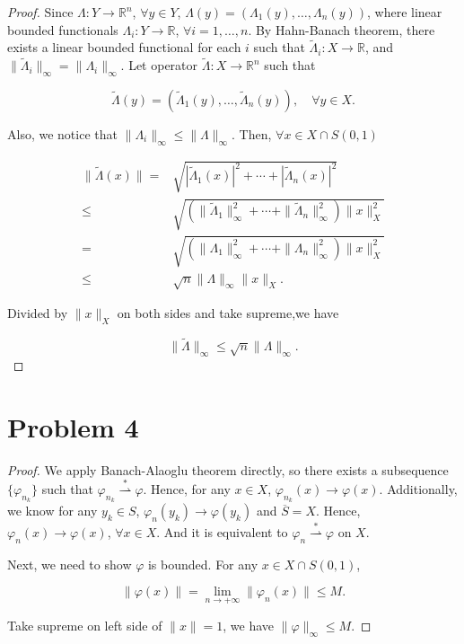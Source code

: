 \documentclass[12pt]{article}
\begin{document}
\begin{proof}

Since $\Lambda: Y \rightarrow \mathbb R^n$, $\forall y\in Y$, $\Lambda(y) = (\Lambda_1(y), \dots, \Lambda_n(y))$, where linear bounded functionals $\Lambda_i : Y \rightarrow \mathbb R$, $\forall i = 1, \dots, n$. By Hahn-Banach theorem, there exists a linear bounded functional for each $i$ such that $\widetilde \Lambda_i: X \rightarrow \mathbb R$, and $\|\widetilde \Lambda_i\|_\infty = \|\Lambda_i\|_\infty$. Let operator $\widetilde\Lambda: X \rightarrow \mathbb R^n$ such that 

$$
\widetilde\Lambda(y) = (\widetilde\Lambda_1(y), \dots, \widetilde\Lambda_n(y)), \quad \forall y\in X.
$$

Also, we notice that $\|\Lambda_i\|_\infty \leqslant \|\Lambda\|_\infty$.
Then, $\forall x\in X\cap S(0, 1)$ 

$$
\begin{aligned}
\|\widetilde\Lambda(x)\| = & \sqrt{|\widetilde\Lambda_1(x)|^2 + \cdots + |\widetilde\Lambda_n(x)|^2} \\
 \leqslant & \sqrt{(\|\widetilde\Lambda_1\|_\infty^2 + \cdots + \|\widetilde\Lambda_n\|_\infty^2) \|x\|_X^2} \\
 = & \sqrt{(\|\Lambda_1\|_\infty^2 + \cdots + \|\Lambda_n\|_\infty^2)\|x\|_X^2} \\
 \leqslant & \sqrt{n} \|\Lambda\|_\infty \|x\|_X.
\end{aligned}
$$ 

Divided by $\|x\|_X$ on both sides and take supreme,we have

$$
\|\widetilde\Lambda\|_\infty \leqslant \sqrt{n} \|\Lambda\|_\infty.
$$

\end{proof}

\section*{Problem 4}

\begin{proof}

We apply Banach-Alaoglu theorem directly, so there exists a subsequence $\{\varphi_{n_k}\}$ such that $\varphi_{n_k} \overset{\ast}{\rightharpoonup} \varphi  $. Hence, for any $x\in X$, $\varphi_{n_k}(x) \rightarrow \varphi(x)$. Additionally, we know for any $y_k \in S$, $\varphi_{n}(y_k) \rightarrow \varphi(y_k)$ and $\overline S = X$. Hence, $\varphi_{n}(x) \rightarrow \varphi(x)$, $\forall x \in X$. And it is equivalent to $\varphi_{n} \overset{\ast}{\rightharpoonup} \varphi$ on $X$. 

Next, we need to show $\varphi$ is bounded. For any $x \in X\cap S(0, 1)$, 

$$ 
\|\varphi(x)\| = \lim_{n \rightarrow +\infty} \|\varphi_n(x)\| \leqslant M.
$$

Take supreme on left side of $\|x\| = 1$, we have $\|\varphi\|_\infty \leqslant M$.

\end{proof}
\end{document}
